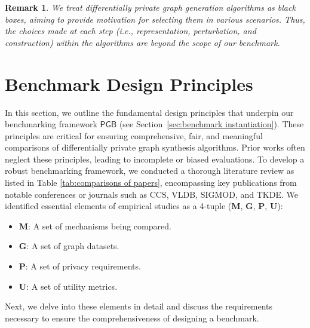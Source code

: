 \documentclass[conference]{IEEEtran}
\theoremstyle{plain}
\newtheorem{remark}{Remark}
\begin{document}
\begin{remark}
    We treat differentially private graph generation algorithms as black boxes, aiming to provide motivation for selecting them in various scenarios. 
    Thus, the choices made at each step (i.e., representation, perturbation, and construction) within the algorithms are beyond the scope of our benchmark.
\end{remark}


\section{Benchmark Design Principles}
\label{sec:benchmark principle}

In this section, we outline the fundamental design principles that underpin our benchmarking framework $\mathsf{PGB}$ (see Section~\ref{sec:benchmark instantiation}). 
These principles are critical for ensuring comprehensive, fair, and meaningful comparisons of differentially private graph synthesis algorithms.
Prior works often neglect these principles, leading to incomplete or biased evaluations.
To develop a robust benchmarking framework, we conducted a thorough literature review as listed in Table \ref{tab:comparisons of papers}, encompassing key publications from notable conferences or journals such as CCS, VLDB, SIGMOD, and TKDE. 
We identified essential elements of empirical studies as a 4-tuple (\textbf{M}, \textbf{G}, \textbf{P}, \textbf{U}):
\begin{itemize}
    \item \textbf{M}: A set of mechanisms being compared.
    \item \textbf{G}: A set of graph datasets.
    \item \textbf{P}: A set of privacy requirements.
    \item \textbf{U}: A set of utility metrics.
\end{itemize}

Next, we delve into these elements in detail and discuss the requirements necessary to ensure the comprehensiveness of designing a benchmark. 
\end{document}
